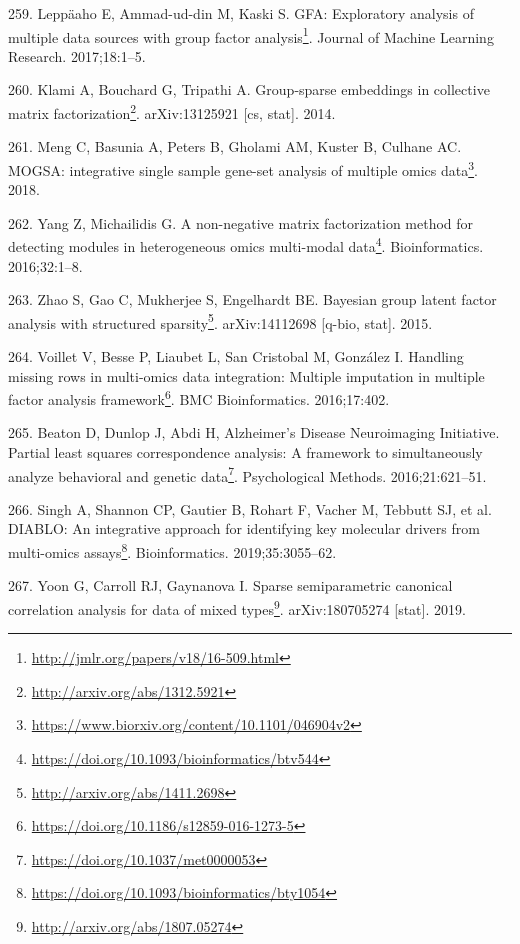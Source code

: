 \documentclass[
  12pt,
  a4paper,
  twoside,
  openright]{book}
\DeclareRobustCommand{\href}[2]{#2\footnote{\url{#1}}}
\newlength{\cslhangindent}
\newlength{\cslentryspacingunit} %
\newenvironment{CSLReferences}[2] %
 {%
  \setlength{\parindent}{0pt}
  \ifodd #1
  \let\oldpar\par
  \def\par{\hangindent=\cslhangindent\oldpar}
  \fi
  \setlength{\parskip}{#2\cslentryspacingunit}
 }%
 {}
\begin{document}
\begin{CSLReferences}{0}{0}
\leavevmode{}%
259. Leppäaho E, Ammad-ud-din M, Kaski S. \href{http://jmlr.org/papers/v18/16-509.html}{GFA: Exploratory analysis of multiple data sources with group factor analysis}. Journal of Machine Learning Research. 2017;18:1--5.

\leavevmode{}%
260. Klami A, Bouchard G, Tripathi A. \href{http://arxiv.org/abs/1312.5921}{Group-sparse embeddings in collective matrix factorization}. arXiv:13125921 {[}cs, stat{]}. 2014.

\leavevmode{}%
261. Meng C, Basunia A, Peters B, Gholami AM, Kuster B, Culhane AC. \href{https://www.biorxiv.org/content/10.1101/046904v2}{MOGSA: integrative single sample gene-set analysis of multiple omics data}. 2018.

\leavevmode{}%
262. Yang Z, Michailidis G. \href{https://doi.org/10.1093/bioinformatics/btv544}{A non-negative matrix factorization method for detecting modules in heterogeneous omics multi-modal data}. Bioinformatics. 2016;32:1--8.

\leavevmode{}%
263. Zhao S, Gao C, Mukherjee S, Engelhardt BE. \href{http://arxiv.org/abs/1411.2698}{Bayesian group latent factor analysis with structured sparsity}. arXiv:14112698 {[}q-bio, stat{]}. 2015.

\leavevmode{}%
264. Voillet V, Besse P, Liaubet L, San Cristobal M, González I. \href{https://doi.org/10.1186/s12859-016-1273-5}{Handling missing rows in multi-omics data integration: Multiple imputation in multiple factor analysis framework}. BMC Bioinformatics. 2016;17:402.

\leavevmode{}%
265. Beaton D, Dunlop J, Abdi H, Alzheimer's Disease Neuroimaging Initiative. \href{https://doi.org/10.1037/met0000053}{Partial least squares correspondence analysis: A framework to simultaneously analyze behavioral and genetic data}. Psychological Methods. 2016;21:621--51.

\leavevmode{}%
266. Singh A, Shannon CP, Gautier B, Rohart F, Vacher M, Tebbutt SJ, et al. \href{https://doi.org/10.1093/bioinformatics/bty1054}{DIABLO: An integrative approach for identifying key molecular drivers from multi-omics assays}. Bioinformatics. 2019;35:3055--62.

\leavevmode{}%
267. Yoon G, Carroll RJ, Gaynanova I. \href{http://arxiv.org/abs/1807.05274}{Sparse semiparametric canonical correlation analysis for data of mixed types}. arXiv:180705274 {[}stat{]}. 2019.


\end{CSLReferences}
\end{document}
